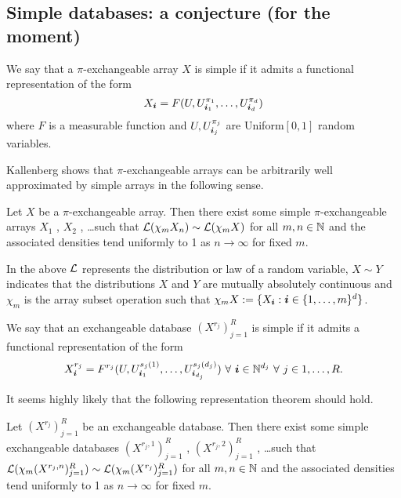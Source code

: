 \subsection{Simple databases: a conjecture (for the moment)}

We say that a $\pi$-exchangeable array $X$ is simple if it admits a functional representation of the form
\begin{equation}
  X_{\bm{i}} = F(U, U^{\pi_1}_{\bm{i}_1}, \dots, U^{\pi_d}_{\bm{i}_d})
\end{equation}
where $F$ is a measurable function and $U, U^{\pi_j}_{\bm{i}_j}$ are \iid Uniform$[0,1]$ random variables.

Kallenberg shows that $\pi$-exchangeable arrays can be arbitrarily well approximated by simple arrays in the following sense.

\begin{thm}
  \label{thm:piex}
  Let $X$ be a $\pi$-exchangeable array.
  Then there exist some simple $\pi$-exchangeable arrays $X_1$ , $X_2$ , \dots such that
  $\mathcal{L}(\chi_m X_n) \sim \mathcal{L}(\chi_m X)$ for all $m,n \in \mathbb{N}$ and the associated densities tend
  uniformly to 1 as $n \to \infty$ for fixed $m$.
\end{thm}

In the above $\mathcal{L}$ represents the distribution or law of a random variable, $X \sim Y$ indicates that the distributions $X$ and $Y$ are mutually absolutely continuous and $\chi_m$ is the array subset operation such that $\chi_m X := \{X_{\bm{i}} : \bm{i} \in \{1,\dots,m\}^d\}$.

We say that an exchangeable database $(X^{r_j})_{j=1}^R$ is simple if it admits a functional representation of the form
\begin{equation}
  X^{r_j}_{\bm{i}} = F^{r_j}(U, U^{s_{j}(1)}_{\bm{i}_1},\dots,U^{s_{j}(d_j)}_{\bm{i}_{d_j}}) \,\, \forall \,\, \bm{i} \in \mathbb{N}^{d_j} \,\, \forall \,\, j \in {1,\dots,R}.
\end{equation}

It seems highly likely that the following representation theorem should hold.

\begin{conj}
  \label{thm:simple-database}
  Let $(X^{r_j})_{j=1}^R$ be an exchangeable database.
  Then there exist some simple exchangeable databases $(X^{r_j,1})_{j=1}^R$ , $(X^{r_j,2})_{j=1}^R$ , \dots such that
  $\mathcal{L}(\chi_m (X^{r_j,n})_{j=1}^R) \sim \mathcal{L}(\chi_m (X^{r_j})_{j=1}^R)$ for all $m,n \in \mathbb{N}$ and the associated densities tend
  uniformly to 1 as $n \to \infty$ for fixed $m$.
\end{conj}

